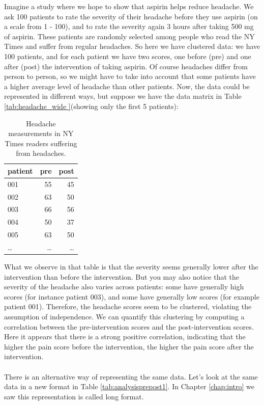 \documentclass[]{book}\usepackage[]{graphicx}\usepackage[]{color}
\begin{document}
Imagine a study where we hope to show that aspirin helps reduce headache. We ask 100 patients to rate the severity of their headache before they use aspirin (on a scale from 1 - 100), and to rate the severity again 3 hours after taking 500 mg of aspirin. These patients are randomly selected among people who read the NY Times and suffer from regular headaches. So here we have clustered data: we have 100 patients, and for each patient we have two scores, one before (pre) and one after (post) the intervention of taking aspirin. Of course headaches differ from person to person, so we might have to take into account that some patients have a higher average level of headache than other patients. Now, the data could be represented in different ways, but suppose we have the data matrix in Table \ref{tab:headache_wide }(showing only the first 5 patients):
 
 
 \begin{table}
 \caption{Headache measurements in NY Times readers suffering from headaches.}
 \begin{tabular}{lrr}
 patient & pre & post \\ \hline
 001 & 55 & 45 \\
 002 & 63 & 50 \\
 003 & 66 & 56 \\
 004 & 50 & 37 \\
 005 & 63 & 50 \\
 \dots & \dots & \dots \\
 \end{tabular}
 \label{tab:headache_wide}
\end{table}

What we observe in that table is that the severity seems generally lower after the intervention than before the intervention. But you may also notice that the severity of the headache also varies across patients: some have generally high scores (for instance patient 003), and some have generally low scores (for example patient 001). Therefore, the headache scores seem to be clustered, violating the assumption of independence. We can quantify this clustering by computing a correlation between the pre-intervention scores and the post-intervention scores. Here it appears that there is a strong positive correlation, indicating that the higher the pain score before the intervention, the higher the pain score after the intervention. 
\\
\\

There is an alternative way of representing the same data. Let's look at the same data in a new format in Table \ref{tab:analysisprepost1}. In Chapter \ref{chap:intro} we saw this representation is called long format.
\end{document}
